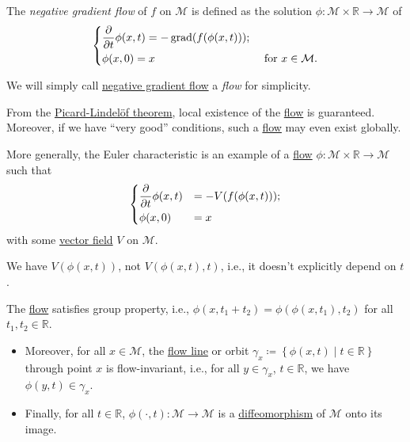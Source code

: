 \begin{definition}\label{def:negative-gradient-flow}
	The \emph{negative gradient flow} of \(f\) on \(\mathcal{M} \) is defined as the solution \(\phi \colon \mathcal{M} \times \mathbb{R} \to \mathcal{M}\) of
	\[
		\begin{dcases}
			\frac{\partial }{\partial t} \phi (x, t) = -\operatorname{grad}(f(\phi (x, t))) ; \\
			\phi (x, 0)                              = x & \text{ for }x\in \mathcal{M} .
		\end{dcases}
	\]
\end{definition}

\begin{note}
	We will simply call \hyperref[def:negative-gradient-flow]{negative gradient flow} a \emph{flow} for simplicity.
\end{note}

\begin{remark}
	From the \href{https://en.wikipedia.org/wiki/Picard-Lindelöf_theorem}{Picard-Lindelöf theorem}, local existence of the \hyperref[def:negative-gradient-flow]{flow} is guaranteed. Moreover, if we have ``very good'' conditions, such a \hyperref[def:negative-gradient-flow]{flow} may even exist globally.
\end{remark}

More generally, the Euler characteristic is an example of a \hyperref[def:negative-gradient-flow]{flow} \(\phi \colon \mathcal{M} \times \mathbb{R} \to \mathcal{M} \) such that
\[
	\begin{dcases}
		\frac{\partial }{\partial t} \phi (x, t) & = -V(f(\phi (x, t))) ; \\
		\phi (x, 0)                              & = x
	\end{dcases}
\]
with some \hyperref[def:vector-field]{vector field} \(V\) on \(\mathcal{M} \).

\begin{note}[Autonomous]
	We have \(V(\phi (x, t))\), not \(V(\phi (x, t), t)\), i.e., it doesn't explicitly depend on \(t\).
\end{note}

\begin{remark}
	The \hyperref[def:negative-gradient-flow]{flow} satisfies group property, i.e., \(\phi (x, t_1 + t_2) = \phi (\phi (x, t_1), t_2)\) for all \(t_1, t_2\in \mathbb{R} \).
	\begin{itemize}
		\item Moreover, for all \(x\in \mathcal{M} \), the \hyperref[def:negative-gradient-flow]{flow line} or orbit \(\gamma _x \coloneqq \left\{ \phi (x, t) \mid t\in \mathbb{R}  \right\}\) through point \(x\) is flow-invariant, i.e., for all \(y\in \gamma _x\), \(t\in \mathbb{R} \), we have \(\phi (y, t)\in \gamma _x\).
		\item Finally, for all \(t\in \mathbb{R} \), \(\phi (\cdot, t) \colon \mathcal{M} \to \mathcal{M} \) is a \hyperref[def:diffeomorphism]{diffeomorphism} of \(\mathcal{M} \) onto its image.
	\end{itemize}
\end{remark}

